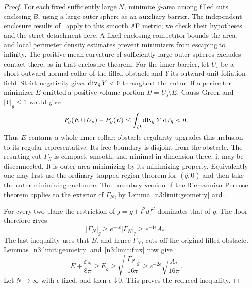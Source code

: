 \begin{proof}
For each fixed sufficiently large \(N\), minimize \(\hat g\)-area
among filled cuts enclosing \(B\), using a large outer sphere as an
auxiliary barrier. The independent enclosure results of~\cite[Lemmas~2.1--2.3]{RiemannianCompanion}
apply to this smooth AF metric; we check their hypotheses and the
strict detachment here.
A fixed enclosing competitor bounds the area, and local perimeter
density estimates prevent minimizers from escaping to infinity.
The positive mean curvature of sufficiently large outer spheres
excludes contact there, as in that enclosure theorem.
For the inner barrier, let \(U_s\) be a short outward normal collar
of the filled obstacle and \(Y\) its outward unit foliation field.
Strict negativity gives \(\operatorname{div}_{\hat g}Y<0\) throughout the collar.
If a perimeter minimizer \(E\) omitted a positive-volume portion
\(D=U_s\setminus E\), Gauss--Green and \(|Y|_{\hat g}\le1\) would give
\[
 P_{\hat g}(E\cup U_s)-P_{\hat g}(E)
       \le\int_D\operatorname{div}_{\hat g}Y\,\mathrm d V_{\hat g}<0.
\]
Thus \(E\) contains a whole inner collar; obstacle regularity upgrades
this inclusion to its regular representative. Its free boundary is
disjoint from the obstacle. The resulting cut \(\Gamma_N\) is compact,
smooth, and minimal in dimension three; it may be disconnected.
It is outer area-minimizing by its minimizing property.
Equivalently one may first use the ordinary trapped-region theorem
for \((\hat g,0)\) and then take the outer minimizing enclosure.
The boundary version of the Riemannian Penrose theorem applies to the
exterior of \(\Gamma_N\), by Lemma~\ref{n3:limit:geometry}
and \cite[Theorem~19]{Bray2001}.

For every two-plane the restriction of \(\bar g=g+l^2df^2\) dominates
that of \(g\). The floor therefore gives
\[
                  |\Gamma_N|_{\hat g}
          \ge e^{-4\epsilon}|\Gamma_N|_g
          \ge e^{-4\epsilon}A_*.
\]
The last inequality uses that \(B\), and hence \(\Gamma_N\), cuts off
the original filled obstacle. Lemmas~\ref{n3:limit:geometry}
and~\ref{n3:limit:flux} now give
\[
 E+\frac{\varepsilon_N}{8\pi}
       \ge E_{\hat g}
       \ge\sqrt{\frac{|\Gamma_N|_{\hat g}}{16\pi}}
       \ge e^{-2\epsilon}\sqrt{\frac{A_*}{16\pi}}.
\]
Let \(N\to\infty\) with \(\epsilon\) fixed, and then
\(\epsilon\downarrow0\). This proves the reduced inequality.


\end{proof}
